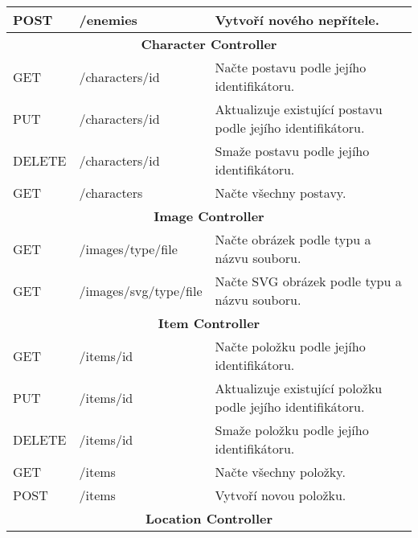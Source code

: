 \begin{longtable}{|l|l|p{}|}
    POST            & /enemies                    & Vytvoří nového nepřítele.                                           \\
    \hline
    \multicolumn{3}{|c|}{\textbf{Character Controller}}                                                                 \\
    \hline
    GET             & /characters/{id}            & Načte postavu podle jejího identifikátoru.                          \\
    PUT             & /characters/{id}            & Aktualizuje existující postavu podle jejího identifikátoru.         \\
    DELETE          & /characters/{id}            & Smaže postavu podle jejího identifikátoru.                          \\
    GET             & /characters                 & Načte všechny postavy.                                              \\
    \hline
    \multicolumn{3}{|c|}{\textbf{Image Controller}}                                                                     \\
    \hline
    GET             & /images/{type}/{file}       & Načte obrázek podle typu a názvu souboru.                           \\
    GET             & /images/svg/{type}/{file}   & Načte SVG obrázek podle typu a názvu souboru.                       \\
    \hline
    \multicolumn{3}{|c|}{\textbf{Item Controller}}                                                                      \\
    \hline
    GET             & /items/{id}                 & Načte položku podle jejího identifikátoru.                          \\
    PUT             & /items/{id}                 & Aktualizuje existující položku podle jejího identifikátoru.         \\
    DELETE          & /items/{id}                 & Smaže položku podle jejího identifikátoru.                          \\
    GET             & /items                      & Načte všechny položky.                                              \\
    POST            & /items                      & Vytvoří novou položku.                                              \\
    \hline
    \multicolumn{3}{|c|}{\textbf{Location Controller}}                                                                  \\

\end{longtable}
